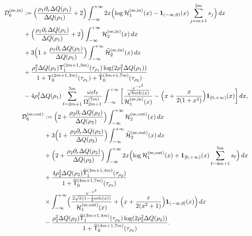 \documentclass[a4paper]{article}
\newcommand{\erfc}{{\rm erfc}}
\numberwithin{equation}{section}
\begin{document}
\begin{align}
\begin{split}
\end{split}
\\
\begin{split}
\mathcal{D}_6^{(\mathrm{se,in})}
&:=
\Bigl(\frac{\rho_1\partial_r\Delta Q(\rho_1)}{\Delta Q(\rho_1)}+2\Bigr)
\int_{-\infty}^{+\infty}
2x\Bigl(\log \mathcal{H}_1^{(\mathrm{se,in})}(x)-\mathbf{1}_{(-\infty,0)}(x)\sum_{j=m+1}^{2m}s_j\Bigr)
\,dx
\\
&
+\Bigl(\frac{\rho_1\partial_r\Delta Q(\rho_1)}{\Delta Q(\rho_1)}+2\Bigr)
\int_{-\infty}^{+\infty}
\mathcal{H}_2^{(\mathrm{se,in})}(x)
\,dx
\\
&
+
3\Bigl(1+\frac{\rho_1\partial_r\Delta Q(\rho_1)}{\Delta Q(\rho_1)}\Bigr)
\int_{-\infty}^{+\infty}
\widetilde{\mathcal{H}}_2^{(\mathrm{se,in})}(x)\,dx
\\
&
+\frac{\rho_1^2\Delta Q(\rho_1)\mathsf{T}_{1}^{(2m+1,3m)}(\tau_{\rho_1})\log (2\rho_1^2\Delta Q(\rho_1))}{1+\mathsf{T}_{0}^{(2m+1,3m)}(\tau_{\rho_1})+\widehat{\mathsf{T}}_{0}^{(3m+1,7m)}(\tau_{\rho_2})}
\\
&
-4\rho_1^2\Delta Q(\rho_1)
\sum_{\ell=2m+1}^{3m}
\frac{\omega_{\ell}t_{\ell}}{\Omega_{2m+1}^{(7m)}}
\int_{-\infty}^{+\infty}
\bigg[
\frac{\frac{e^{-x^2}}{\sqrt{\pi}\erfc(x)}}{
\mathcal{H}_1^{(\mathrm{se,in})}(x)
}
-
\Bigl( 
x+\frac{x}{2(1+x^2)}
\Bigr)
\mathbf{1}_{[0,+\infty)}(x)
\bigg]
\,dx,
\end{split}
\\
\begin{split}
\mathcal{D}_6^{(\mathrm{se,out})}
&:=
\Bigl(2+\frac{\rho_2\partial_r\Delta Q(\rho_2)}{\Delta Q(\rho_2)}\Bigr)
\int_{-\infty}^{+\infty}
\mathcal{H}_{2}^{(\mathrm{se,out})}(x)
\,dx
\\
&
+3\Bigl(1+\frac{\rho_2\partial_r\Delta Q(\rho_2)}{\Delta Q(\rho_2)}\Bigr)
\int_{-\infty}^{+\infty}
\widetilde{\mathcal{H}}_{2}^{(\mathrm{se,out})}
(x)
\,dx
\\
&
+\Bigl(2+\frac{\rho_2\partial_r\Delta Q(\rho_2)}{\Delta Q(\rho_2)}\Bigr)
\int_{-\infty}^{+\infty}
2x\Bigl( \log \mathcal{H}_{1}^{(\mathrm{se,out})}
(x)
+\mathbf{1}_{[0,+\infty)}(x)\sum_{\ell=4m+1}^{5m}s_{\ell}\Bigr)
\,dx
\\
&
+
\frac{4\rho_2^2\Delta Q(\rho_2)\widehat{\mathsf{T}}_1^{(3m+1,4m)}(\tau_{\rho_2})}{1+\widehat{\mathsf{T}}_0^{(4m+1,7m)}(\tau_{\rho_2})}
\\
&\times
\int_{-\infty}^{+\infty}
\Bigl( 
\frac{\frac{e^{-x^2}}{2\sqrt{\pi}(1-\frac{1}{2}\erfc(x))}}{\mathcal{H}_{1}^{(\mathrm{se,out})}
(x)}
+
\Bigl(x+\frac{x}{2(x^2+1)}\Bigr)\mathbf{1}_{(-\infty,0]}(x)
\Bigr)\,dx
\\
&
-\frac{\rho_2^2\Delta Q(\rho_2)\widehat{\mathsf{T}}_1^{(3m+1,4m)}(\tau_{\rho_2})\log (2\rho_2^2\Delta Q(\rho_2))}{1+\widehat{\mathsf{T}}_0^{(4m+1,7m)}(\tau_{\rho_2})}.
\end{split}
\end{align}
\end{document}
